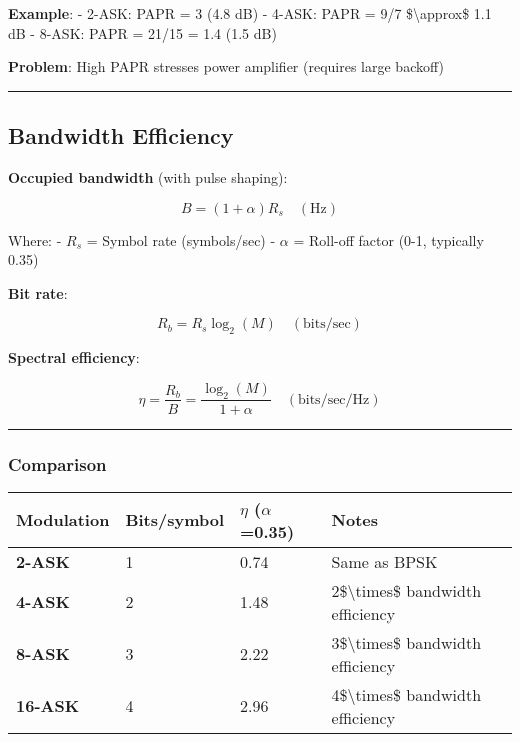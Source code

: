 \textbf{Example}: - 2-ASK: PAPR = 3 (4.8 dB) - 4-ASK: PAPR = 9/7
\$\textbackslash approx\$ 1.1 dB - 8-ASK: PAPR = 21/15 = 1.4 (1.5 dB)

\textbf{Problem}: High PAPR stresses power amplifier (requires large
backoff)

\begin{center}\rule{0.5\linewidth}{0.5pt}\end{center}

\subsection{Bandwidth Efficiency}\label{bandwidth-efficiency}

\textbf{Occupied bandwidth} (with pulse shaping):

\[
B = (1 + \alpha) R_s \quad (\text{Hz})
\]

Where: - \(R_s\) = Symbol rate (symbols/sec) - \(\alpha\) = Roll-off
factor (0-1, typically 0.35)

\textbf{Bit rate}:

\[
R_b = R_s \log_2(M) \quad (\text{bits/sec})
\]

\textbf{Spectral efficiency}:

\[
\eta = \frac{R_b}{B} = \frac{\log_2(M)}{1 + \alpha} \quad (\text{bits/sec/Hz})
\]

\begin{center}\rule{0.5\linewidth}{0.5pt}\end{center}

\subsubsection{Comparison}\label{comparison}

{\def\LTcaptype{} %
\begin{longtable}[]{@{}llll@{}}
\toprule\noalign{}
Modulation & Bits/symbol & \(\eta\) (\(\alpha\)=0.35) & Notes \\
\midrule\noalign{}
\endhead
\bottomrule\noalign{}
\endlastfoot
\textbf{2-ASK} & 1 & 0.74 & Same as BPSK \\
\textbf{4-ASK} & 2 & 1.48 & 2\$\textbackslash times\$ bandwidth
efficiency \\
\textbf{8-ASK} & 3 & 2.22 & 3\$\textbackslash times\$ bandwidth
efficiency \\
\textbf{16-ASK} & 4 & 2.96 & 4\$\textbackslash times\$ bandwidth
efficiency \\
\end{longtable}
}

